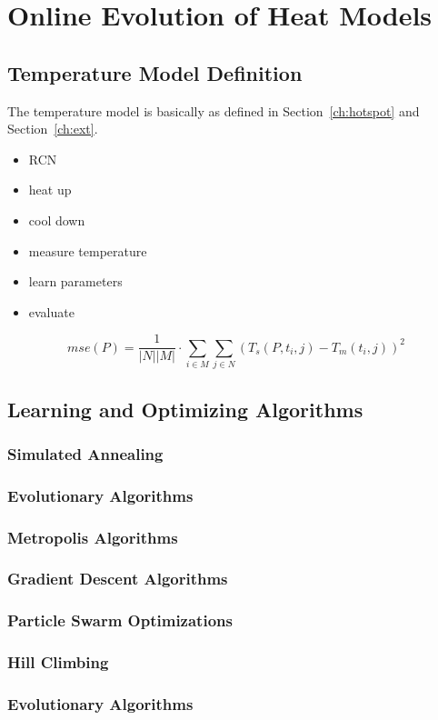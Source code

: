 
\chapter{Online Evolution of Heat Models}
\label{ch:onlineevo}


\section{Temperature Model Definition}

The temperature model is basically as defined in Section~\ref{ch:hotspot} and Section~\ref{ch:ext}.

\begin{itemize}
	\item RCN
	\item heat up
	\item cool down
	\item measure temperature
	\item learn parameters
	\item evaluate
\end{itemize}

\begin{equation}
\label{eq:mse}
mse(P)=\frac{1}{|N||M|} \cdot \sum_{i\in M} \sum_{j\in N} (T_s(P,t_i,j)-T_m(t_i,j))^2
\end{equation}

\section{Learning and Optimizing Algorithms}
\subsection{Simulated Annealing}

\subsection{Evolutionary Algorithms}
\subsection{Metropolis Algorithms}

\subsection{Gradient Descent Algorithms}

\subsection{Particle Swarm Optimizations}

\subsection{Hill Climbing}
\subsection{Evolutionary Algorithms}